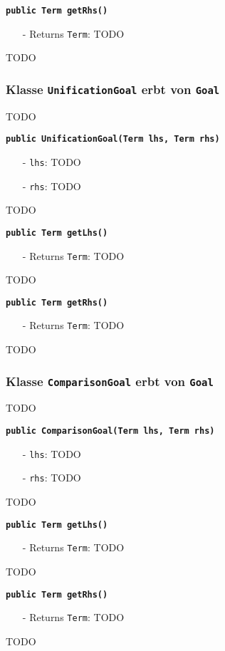 \documentclass[parskip=full,11pt,twoside]{scrartcl}
\begin{document}
\textbf{\texttt{public Term getRhs()}}
\begin{itemize}[noitemsep]
	\item[-] Returns \texttt{Term}: TODO
\end{itemize}
TODO

\subsubsection{Klasse \texttt{UnificationGoal} erbt von \texttt{Goal}}
TODO

\textbf{\texttt{public UnificationGoal(Term lhs, Term rhs)}}
\begin{itemize}[noitemsep]
	\item[-] \texttt{lhs}: TODO
	\item[-] \texttt{rhs}: TODO
\end{itemize}
TODO

\textbf{\texttt{public Term getLhs()}}
\begin{itemize}[noitemsep]
	\item[-] Returns \texttt{Term}: TODO
\end{itemize}
TODO

\textbf{\texttt{public Term getRhs()}}
\begin{itemize}[noitemsep]
	\item[-] Returns \texttt{Term}: TODO
\end{itemize}
TODO

\subsubsection{Klasse \texttt{ComparisonGoal} erbt von \texttt{Goal}}
TODO

\textbf{\texttt{public ComparisonGoal(Term lhs, Term rhs)}}
\begin{itemize}[noitemsep]
	\item[-] \texttt{lhs}: TODO
	\item[-] \texttt{rhs}: TODO
\end{itemize}
TODO

\textbf{\texttt{public Term getLhs()}}
\begin{itemize}[noitemsep]
	\item[-] Returns \texttt{Term}: TODO
\end{itemize}
TODO

\textbf{\texttt{public Term getRhs()}}
\begin{itemize}[noitemsep]
	\item[-] Returns \texttt{Term}: TODO
\end{itemize}
TODO
\end{document}
